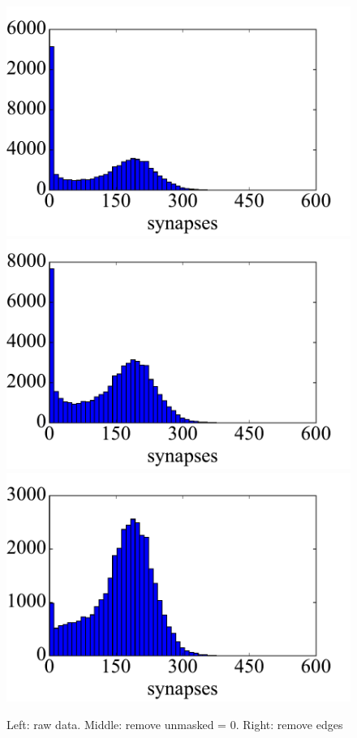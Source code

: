 \documentclass{article}
\begin{document}
\begin{figure}[h]
  \centering
  \includegraphics[scale=.3]{Fig5a}
  \includegraphics[scale=.3]{Fig5b}
  \includegraphics[scale=.3]{Fig5c}
  \caption{Left: raw data. Middle: remove unmasked = 0. Right: remove edges}
\end{figure} 
\end{document}

